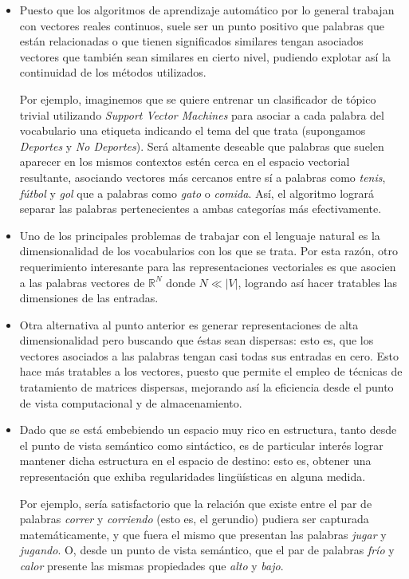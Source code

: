 \begin{itemize}

\item Puesto que los algoritmos de aprendizaje automático por lo general trabajan con vectores
reales continuos, suele ser un punto positivo que palabras que están relacionadas o que tienen
significados similares tengan asociados vectores que también sean similares en cierto nivel,
pudiendo explotar así la continuidad de los métodos utilizados.

Por ejemplo, imaginemos que se quiere entrenar un clasificador de tópico trivial utilizando
\textit{Support Vector Machines} para asociar a cada palabra del vocabulario una etiqueta indicando
el tema del que trata (supongamos \textit{Deportes} y \textit{No Deportes}). Será altamente deseable
que palabras que suelen aparecer en los mismos contextos estén cerca en el espacio vectorial
resultante, asociando vectores más cercanos entre sí a palabras como \textit{tenis}, \textit{fútbol}
y \textit{gol} que a palabras como \textit{gato} o \textit{comida}. Así, el algoritmo logrará
separar las palabras pertenecientes a ambas categorías más efectivamente.

\item Uno de los principales problemas de trabajar con el lenguaje natural es la dimensionalidad de
los vocabularios con los que se trata. Por esta razón, otro requerimiento interesante para las
representaciones vectoriales es que asocien a las palabras vectores de $\mathbb{R}^N$ donde $N \ll
|V|$, logrando así hacer tratables las dimensiones de las entradas.

\item Otra alternativa al punto anterior es generar representaciones de alta dimensionalidad pero
buscando que éstas sean dispersas: esto es, que los vectores asociados a las palabras tengan casi
todas sus entradas en cero. Esto hace más tratables a los vectores, puesto que permite el empleo de
técnicas de tratamiento de matrices dispersas, mejorando así la eficiencia desde el punto de vista
computacional y de almacenamiento.

\item Dado que se está embebiendo un espacio muy rico en estructura, tanto desde el punto de vista
semántico como sintáctico, es de particular interés lograr mantener dicha estructura en el espacio
de destino: esto es, obtener una representación que exhiba regularidades lingüísticas en alguna
medida.

Por ejemplo, sería satisfactorio que la relación que existe entre el par de palabras \textit{correr}
y \textit{corriendo} (esto es, el gerundio) pudiera ser capturada matemáticamente, y que fuera el
mismo que presentan las palabras \textit{jugar} y \textit{jugando}. O, desde un punto de vista
semántico, que el par de palabras \textit{frío} y \textit{calor} presente las mismas propiedades que
\textit{alto} y \textit{bajo}.

\end{itemize}


